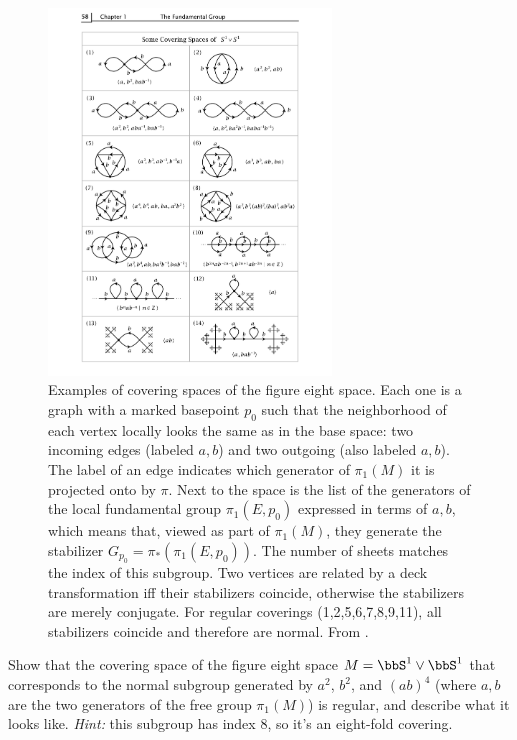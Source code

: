 \begin{figure}
    \centering
    \includegraphics[width=0.67\textwidth]{figures/coverings_8.pdf}
    \caption{Examples of covering spaces of the figure eight space. Each one is a graph with a marked basepoint $p_0$ such that the neighborhood of each vertex locally looks the same as in the base space: two incoming edges (labeled $a,b$) and two outgoing (also labeled $a,b$). The label of an edge indicates which generator of $\pi_1(M)$ it is projected onto by $\pi$. Next to the space is the list of the generators of the local fundamental group $\pi_1(E,p_0)$ expressed in terms of $a,b$, which means that, viewed as part of $\pi_1(M)$, they generate the stabilizer $G_{p_0}=\pi_\ast(\pi_1(E,p_0))$. The number of sheets matches the index of this subgroup. Two vertices are related by a deck transformation iff their stabilizers coincide, otherwise the stabilizers are merely conjugate. For regular coverings (1,2,5,6,7,8,9,11), all stabilizers coincide and therefore are normal. From \cite[p.~58]{Hatcher}.}
    \label{fig:coverings of 8}
\end{figure}


\begin{xca}
    Show that the covering space of the figure eight space $M=\bbS^1\vee \bbS^1$ that corresponds to the normal subgroup generated by $a^2$, $b^2$, and $(ab)^4$ (where $a,b$ are the two generators of the free group $\pi_1(M)$) is regular, and describe what it looks like. \emph{Hint:} this subgroup has index 8, so it's an eight-fold covering.
\end{xca}

